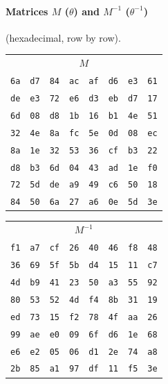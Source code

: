 \documentclass[11pt,a4paper]{article}
\begin{document}
\paragraph{Matrices $M$ ($\theta$) and $M^{-1}$ ($\theta^{-1}$)} (hexadecimal, row by row).

\begin{center}\small\setlength{\tabcolsep}{4pt}
\begin{tabular}{@{}cccccccc@{}}
\multicolumn{8}{c}{$M$}\\[2pt]
\texttt{6a} & \texttt{d7} & \texttt{84} & \texttt{ac} & \texttt{af} & \texttt{d6} & \texttt{e3} & \texttt{61}\\
\texttt{de} & \texttt{e3} & \texttt{72} & \texttt{e6} & \texttt{d3} & \texttt{eb} & \texttt{d7} & \texttt{17}\\
\texttt{6d} & \texttt{08} & \texttt{d8} & \texttt{1b} & \texttt{16} & \texttt{b1} & \texttt{4e} & \texttt{51}\\
\texttt{32} & \texttt{4e} & \texttt{8a} & \texttt{fc} & \texttt{5e} & \texttt{0d} & \texttt{08} & \texttt{ec}\\
\texttt{8a} & \texttt{1e} & \texttt{32} & \texttt{53} & \texttt{36} & \texttt{cf} & \texttt{b3} & \texttt{22}\\
\texttt{d8} & \texttt{b3} & \texttt{6d} & \texttt{04} & \texttt{43} & \texttt{ad} & \texttt{1e} & \texttt{f0}\\
\texttt{72} & \texttt{5d} & \texttt{de} & \texttt{a9} & \texttt{49} & \texttt{c6} & \texttt{50} & \texttt{18}\\
\texttt{84} & \texttt{50} & \texttt{6a} & \texttt{27} & \texttt{a6} & \texttt{0e} & \texttt{5d} & \texttt{3e}\\
\end{tabular}
\qquad
\begin{tabular}{@{}cccccccc@{}}
\multicolumn{8}{c}{$M^{-1}$}\\[2pt]
\texttt{f1} & \texttt{a7} & \texttt{cf} & \texttt{26} & \texttt{40} & \texttt{46} & \texttt{f8} & \texttt{48}\\
\texttt{36} & \texttt{69} & \texttt{5f} & \texttt{5b} & \texttt{d4} & \texttt{15} & \texttt{11} & \texttt{c7}\\
\texttt{4d} & \texttt{b9} & \texttt{41} & \texttt{23} & \texttt{50} & \texttt{a3} & \texttt{55} & \texttt{92}\\
\texttt{80} & \texttt{53} & \texttt{52} & \texttt{4d} & \texttt{f4} & \texttt{8b} & \texttt{31} & \texttt{19}\\
\texttt{ed} & \texttt{73} & \texttt{15} & \texttt{f2} & \texttt{78} & \texttt{4f} & \texttt{aa} & \texttt{26}\\
\texttt{99} & \texttt{ae} & \texttt{e0} & \texttt{09} & \texttt{6f} & \texttt{d6} & \texttt{1e} & \texttt{68}\\
\texttt{e6} & \texttt{e2} & \texttt{05} & \texttt{06} & \texttt{d1} & \texttt{2e} & \texttt{74} & \texttt{a8}\\
\texttt{2b} & \texttt{85} & \texttt{a1} & \texttt{97} & \texttt{df} & \texttt{11} & \texttt{f5} & \texttt{3e}\\
\end{tabular}
\end{center}
\end{document}
